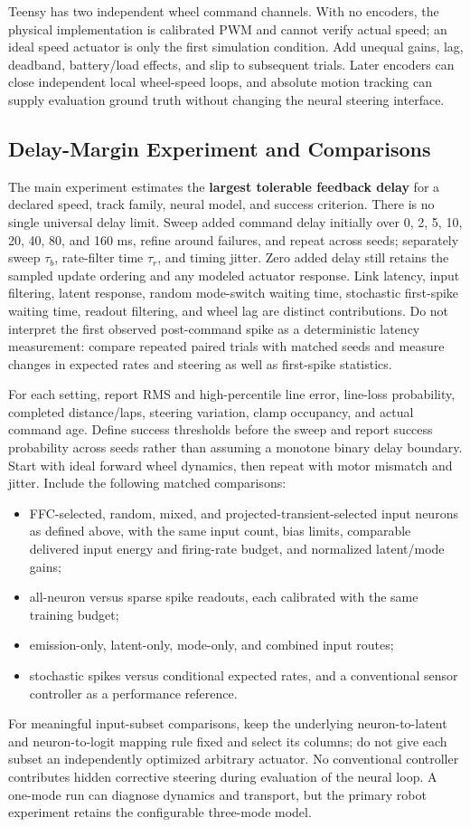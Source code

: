 Teensy has two independent wheel command channels. With no encoders, the physical implementation is calibrated PWM and cannot verify actual speed; an ideal speed actuator is only the first simulation condition. Add unequal gains, lag, deadband, battery/load effects, and slip to subsequent trials. Later encoders can close independent local wheel-speed loops, and absolute motion tracking can supply evaluation ground truth without changing the neural steering interface.

\subsection{Delay-Margin Experiment and Comparisons}
The main experiment estimates the \textbf{largest tolerable feedback delay} for a declared speed, track family, neural model, and success criterion. There is no single universal delay limit. Sweep added command delay initially over 0, 2, 5, 10, 20, 40, 80, and 160 ms, refine around failures, and repeat across seeds; separately sweep $\tau_b$, rate-filter time $\tau_r$, and timing jitter. Zero added delay still retains the sampled update ordering and any modeled actuator response. Link latency, input filtering, latent response, random mode-switch waiting time, stochastic first-spike waiting time, readout filtering, and wheel lag are distinct contributions. Do not interpret the first observed post-command spike as a deterministic latency measurement: compare repeated paired trials with matched seeds and measure changes in expected rates and steering as well as first-spike statistics.

For each setting, report RMS and high-percentile line error, line-loss probability, completed distance/laps, steering variation, clamp occupancy, and actual command age. Define success thresholds before the sweep and report success probability across seeds rather than assuming a monotone binary delay boundary. Start with ideal forward wheel dynamics, then repeat with motor mismatch and jitter. Include the following matched comparisons:
\begin{itemize}
\item FFC-selected, random, mixed, and projected-transient-selected input neurons as defined above, with the same input count, bias limits, comparable delivered input energy and firing-rate budget, and normalized latent/mode gains;
\item all-neuron versus sparse spike readouts, each calibrated with the same training budget;
\item emission-only, latent-only, mode-only, and combined input routes;
\item stochastic spikes versus conditional expected rates, and a conventional sensor controller as a performance reference.
\end{itemize}
For meaningful input-subset comparisons, keep the underlying neuron-to-latent and neuron-to-logit mapping rule fixed and select its columns; do not give each subset an independently optimized arbitrary actuator. No conventional controller contributes hidden corrective steering during evaluation of the neural loop. A one-mode run can diagnose dynamics and transport, but the primary robot experiment retains the configurable three-mode model.

